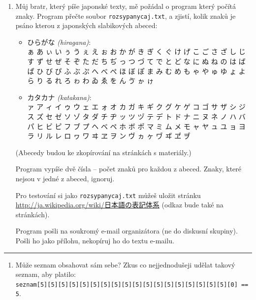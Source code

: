 \documentclass[a4paper,10pt]{article}
\begin{document}
\begin{enumerate}[resume]

\item \label{kanacountstart}
    Můj bratr, který píše japonské texty, mě požádal o program
    který počítá znaky.
    Program přečte soubor \verb+rozsypanycaj.txt+, a zjistí,
    kolik znaků je psáno kterou z japonských slabikových abeced:
    \begin{itemize}
    \item { ひらがな \emph{(hiragana)}:
        \\ ぁ あ ぃ い ぅ う ぇ え ぉ お か が き ぎ く
        ぐ け げ こ ご さ ざ し じ す ず せ ぜ そ ぞ た
        だ ち ぢ っ つ づ て で と ど な に ぬ ね の は
        ば ぱ ひ び ぴ ふ ぶ ぷ へ べ ぺ ほ ぼ ぽ ま み
        む め も ゃ や ゅ ゆ ょ よ ら り る れ ろ ゎ わ
        ゐ ゑ を ん ゔ ゕ ゖ}
    \item { カタカナ \emph{(katakana)}:
        \\ ァ ア ィ イ ゥ ウ ェ エ ォ オ カ ガ キ ギ ク
        グ ケ ゲ コ ゴ サ ザ シ ジ ス ズ セ ゼ ソ ゾ タ
        ダ チ ヂ ッ ツ ヅ テ デ ト ド ナ ニ ヌ ネ ノ ハ
        バ パ ヒ ビ ピ フ ブ プ ヘ ベ ペ ホ ボ ポ マ ミ
        ム メ モ ャ ヤ ュ ユ ョ ヨ ラ リ ル レ ロ ヮ ワ
        ヰ ヱ ヲ ン ヴ ヵ ヶ ヷ ヸ ヹ ヺ}
    \end{itemize}
    (Abecedy budou ke zkopírování na stránkách s materiály.)

    Program vypíše dvě čísla – počet znaků pro každou z abeced.
    Znaky, které nejsou v jedné z abeced, ignoruj.

    Pro testování si jako \verb+rozsypanycaj.txt+ můžeš uložit stránku
    \href{http://ja.wikipedia.org/wiki/%E6%97%A5%E6%9C%AC%E8%AA%9E%E3%81%AE%E8%A1%A8%E8%A8%98%E4%BD%93%E7%B3%BB}{
        http://ja.wikipedia.org/wiki/{日本語の表記体系}}
    (odkaz bude také na stránkách).

    Program pošli na soukromý e-mail organizátora (ne do diskusní skupiny).
    Pošli ho jako přílohu, nekopíruj ho do textu e-mailu.

\end{enumerate}

\hrule

\begin{enumerate}[resume]

\item Může seznam obsahovat sám sebe? Zkus co nejjednodušeji udělat takový seznam, aby platilo:
    \\\verb+seznam[5][5][5][5][5][5][5][5][5][5][5][5][5][5][5][5][5][5][0] == 5+.

\end{enumerate}
\end{document}
